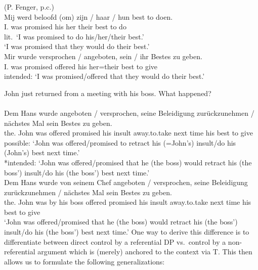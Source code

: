\documentclass[output=paper]{langsci/langscibook}
\begin{document}
\ea\label{ex:key:23.10}
	\ea\label{ex:key:23.10a}  (P. Fenger, p.c.)\\
        \gll \llap{*}Mij  werd  beloofd  (om)  zijn / haar / hun  best  to doen.\\
            I.\Dat{}  was  promised  \hphantom{(}\Comp{}  his {} her {} their  best  to do\\
        \glt lit.\ ‘I was promised to do his/her/their best.’ \\
			‘I was promised that they would do their best.’
    \ex\label{ex:key:23.10b} \\
        \gll \llap{*}Mir  wurde  versprochen / angeboten,  sein / ihr  Bestes  zu geben.\\
            I.\Dat{}  was  promised {} offered  his {} her=their  best  to give\\
        \glt intended: ‘I was promised/offered that they would do their best.’
	\z
\z

\ea\label{ex:key:23.11} John just returned from a meeting with his boss. What happened?\\
    \ea\label{ex:key:23.11a}\\
		\gll Dem Hans  wurde  angeboten / versprochen,  seine Beleidigung  zurückzunehmen  /  nächstes Mal  sein Bestes  zu geben.\\
            the.\Dat{} John  was  offered {} promised his insult  away.to.take {}  next time  his best  to give\\
		\glt possible: ‘John was offered/promised to retract his (=John’s) insult/do his (John’s) best next time.’\\
			*intended: ‘John was offered/promised that he (the boss) would retract his (the boss’) insult/do his (the boss’) best next time.’
    \ex\label{ex:key:23.11b} \\
		\gll Dem Hans  wurde  von seinem Chef  angeboten / versprochen, seine Beleidigung  zurückzunehmen  /  nächstes Mal  sein Bestes  zu geben.\\
         the.\Dat{} John  was  by his boss  offered {} promised his insult  away.to.take {}  next time  his best  to give\\
		\glt ‘John was offered/promised that he (the boss) would retract his
        (the boss') insult/do his (the boss’) best next time.’
	\z
\z
%
One way to derive this difference is to differentiate between direct control by
a referential DP vs.\ control by a non-referential argument which is (merely)
anchored to the context via T. This then allows us to formulate the following
generalizations:
\end{document}
